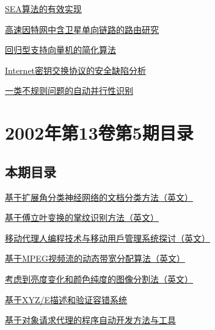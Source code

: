 \documentclass[a4paper]{article}
\begin{document}
\href{http://www.jos.org.cn/ch/reader/download_pdf.aspx?file_no=20020618&year_id=2002&quarter_id=6&falg=1}{SEA算法的有效实现}

\href{http://www.jos.org.cn/ch/reader/download_pdf.aspx?file_no=20020619&year_id=2002&quarter_id=6&falg=1}{高速因特网中含卫星单向链路的路由研究}

\href{http://www.jos.org.cn/ch/reader/download_pdf.aspx?file_no=20020620&year_id=2002&quarter_id=6&falg=1}{回归型支持向量机的简化算法}

\href{http://www.jos.org.cn/ch/reader/download_pdf.aspx?file_no=20020621&year_id=2002&quarter_id=6&falg=1}{Internet密钥交换协议的安全缺陷分析}

\href{http://www.jos.org.cn/ch/reader/download_pdf.aspx?file_no=20020622&year_id=2002&quarter_id=6&falg=1}{一类不规则问题的自动并行性识别}


\section{\textbf{2002年第13卷第5期目录}}
\subsection{本期目录}
\href{http://www.jos.org.cn/ch/reader/download_pdf.aspx?file_no=20020501&year_id=2002&quarter_id=5&falg=1}{基于扩展角分类神经网络的文档分类方法（英文）}

\href{http://www.jos.org.cn/ch/reader/download_pdf.aspx?file_no=20020502&year_id=2002&quarter_id=5&falg=1}{基于傅立叶变换的掌纹识别方法（英文）}

\href{http://www.jos.org.cn/ch/reader/download_pdf.aspx?file_no=20020503&year_id=2002&quarter_id=5&falg=1}{移动代理人编程技术与移动用戶管理系统探讨（英文）}

\href{http://www.jos.org.cn/ch/reader/download_pdf.aspx?file_no=20020504&year_id=2002&quarter_id=5&falg=1}{基于MPEG视频流的动态带宽分配算法（英文）}

\href{http://www.jos.org.cn/ch/reader/download_pdf.aspx?file_no=20020505&year_id=2002&quarter_id=5&falg=1}{考虑到亮度变化和颜色纯度的图像分割法（英文）}

\href{http://www.jos.org.cn/ch/reader/download_pdf.aspx?file_no=20020506&year_id=2002&quarter_id=5&falg=1}{基于XYZ/E描述和验证容错系统}

\href{http://www.jos.org.cn/ch/reader/download_pdf.aspx?file_no=20020507&year_id=2002&quarter_id=5&falg=1}{基于对象请求代理的程序自动开发方法与工具}
\end{document}

